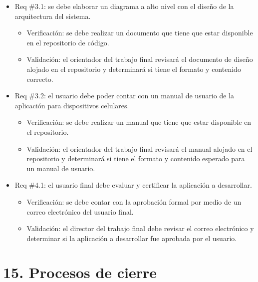 \documentclass[
11pt, %
]{charter}
\begin{document}
\begin{itemize}
\item Req \#3.1: se debe elaborar un diagrama a alto nivel con el diseño de la arquitectura del sistema.

\begin{itemize}
	\item Verificación: se debe realizar un documento que tiene que estar disponible en el repositorio de código.
	\item Validación: el orientador del trabajo final revisará el documento de diseño alojado en el repositorio y determinará si tiene el formato y contenido correcto.
\end{itemize}

\item Req \#3.2: el usuario debe poder contar con un manual de usuario de la aplicación para dispositivos celulares.

\begin{itemize}
	\item Verificación: se debe realizar un manual que tiene que estar disponible en el repositorio.
	\item Validación: el orientador del trabajo final revisará el manual alojado en el repositorio y determinará si tiene el formato y contenido esperado para un manual de usuario.
\end{itemize}

\item Req \#4.1: el usuario final debe evaluar y certificar la aplicación a desarrollar.

\begin{itemize}
	\item Verificación: se debe contar con la aprobación formal por medio de un correo electrónico del usuario final.
	\item Validación: el director del trabajo final debe revisar el correo electrónico y determinar si la aplicación a desarrollar fue aprobada por el usuario.
\end{itemize}



\end{itemize}




\section{15. Procesos de cierre}    
\label{sec:cierre}
\end{document}
